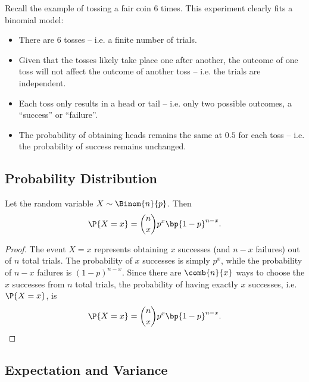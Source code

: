 \begin{example}
    Recall the example of tossing a fair coin 6 times. This experiment clearly fits a binomial model:
    \begin{itemize}
        \item There are 6 tosses -- i.e. a finite number of trials.
        \item Given that the tosses likely take place one after another, the outcome of one toss will not affect the outcome of another toss -- i.e. the trials are independent.
        \item Each toss only results in a head or tail -- i.e. only two possible outcomes, a ``success'' or ``failure''.
        \item The probability of obtaining heads remains the same at $0.5$ for each toss -- i.e. the probability of success remains unchanged.
    \end{itemize}
\end{example}

\subsection{Probability Distribution}

\begin{proposition}
    Let the random variable $X \sim \Binom{n}{p}$. Then \[\P{X = x} = \binom{n}{x} p^x \bp{1 - p}^{n-x}.\]
\end{proposition}
\begin{proof}
    The event $X = x$ represents obtaining $x$ successes (and $n-x$ failures) out of $n$ total trials. The probability of $x$ successes is simply $p^x$, while the probability of $n-x$ failures is $(1-p)^{n-x}$. Since there are $\comb{n}{x}$ ways to choose the $x$ successes from $n$ total trials, the probability of having exactly $x$ successes, i.e. $\P{X = x}$, is \[\P{X = x} = \binom{n}{x} p^x \bp{1 - p}^{n-x}.\]
\end{proof}

\clearpage
\subsection{Expectation and Variance}


